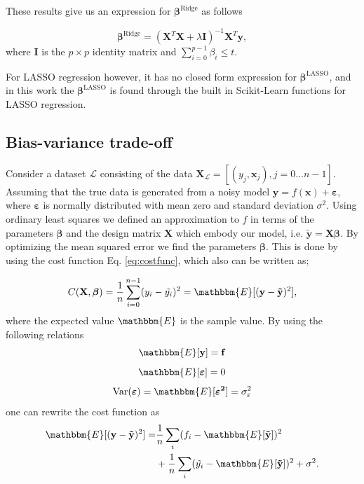 \documentclass[norsk,a4paper,12pt]{article}
\begin{document}
\begin{multicols}{2}
These results give us an expression for $\boldsymbol{\beta}^{\mathrm{Ridge}}$ as follows

\begin{equation}
    \boldsymbol{\beta}^{\mathrm{Ridge}} = (\mathbf{X}^T \mathbf{X} + \lambda \mathbf{I})^{-1} \mathbf{X}^T \mathbf{y},
    \label{eq:ridge-beta}
\end{equation}
where $\mathbf{I}$ is the $p \times p$ identity matrix and $\sum_{i=0}^{p-1} \beta_i \leq t$.

For LASSO regression however, it has no closed form expression for $\boldsymbol{\beta}^{\mathrm{LASSO}}$, and in this work the $\boldsymbol{\beta}^{\mathrm{LASSO}}$ is found through the built in Scikit-Learn functions for LASSO regression.

\subsection{Bias-variance trade-off}
Consider a dataset $\mathcal{L}$ consisting of the data $\mathbf{X}_{\mathcal{L}} = [(y_j , \mathbf{x}_j), j = 0 ... n-1]$. Assuming that the true data is generated from a noisy model $\mathbf{y} = f(\mathbf{x}) + \boldsymbol{\varepsilon}$, where $\boldsymbol{\varepsilon}$ is normally distributed with mean zero and standard deviation $\sigma^2$. Using ordinary least squares we defined an approximation to $f$ in terms of the parameters $\boldsymbol{\beta}$ and the design matrix $\mathbf{X}$ which embody our model, i.e. $\mathbf{\tilde{y}} = \mathbf{X} \boldsymbol{\beta}$. By optimizing the mean squared error we find the parameters $\boldsymbol{\beta}$. This is done by using the cost function Eq. \ref{eq:costfunc}, which also can be written as;

\begin{equation*}
    C(\mathbf{X}, \boldsymbol{\beta}) = \frac{1}{n} \sum_{i=0}^{n-1} (y_i - \tilde{y_i})^2 = \mathbbm{E}[(\mathbf{y} - \mathbf{\tilde{y}})^2],
\end{equation*}
where the expected value $\mathbbm{E}$ is the sample value. By using the following relations \cite{bias-variance}
\begin{equation*}
 \mathbbm{E}[\mathbf{y}] = \mathbf{f}
\end{equation*}
\begin{equation*}
 \mathbbm{E}[\boldsymbol{\varepsilon}] = 0
\end{equation*}
\begin{equation*}
 \mathrm{Var}(\boldsymbol{\varepsilon}) = \mathbbm{E}[\boldsymbol{\varepsilon^2}] = \sigma_{\varepsilon}^2
\end{equation*}
one can rewrite the cost function as 
\begin{equation*}
\begin{split}
    \mathbbm{E}[(\mathbf{y} - \mathbf{\tilde{y}})^2] = & \frac{1}{n} \sum_i (f_i - \mathbbm{E}[\mathbf{\tilde{y}}])^2 \\ & + \frac{1}{n} \sum_i (\tilde{y_i} - \mathbbm{E}[\mathbf{\tilde{y}}])^2 + \sigma^2 . 
\end{split}
\end{equation*}


\end{multicols}
\end{document}
